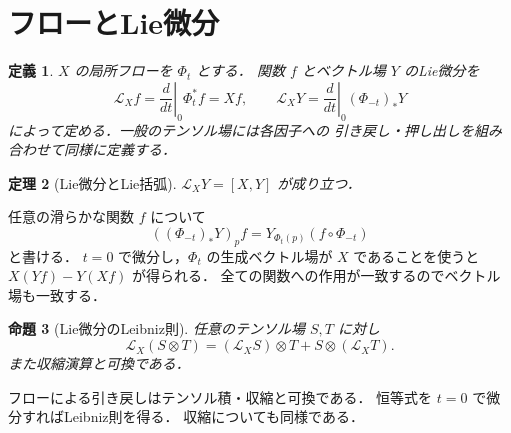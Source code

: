 \documentclass[a5paper,10pt,onecolumn]{jsarticle}
\makeatletter
\theoremstyle{mathnotetheorem}
\newtheorem{theorem}{定理}[section]
\newtheorem{definition}[theorem]{定義}
\newtheorem{proposition}[theorem]{命題}
\renewcommand{\proofname}{証明}
\renewenvironment{proof}[1][\proofname]{%
  \par\pushQED{\qed}\normalfont\topsep4\p@\@plus2\p@\relax
  \trivlist\item[\hskip\labelsep\bfseries #1]\ignorespaces
}{\popQED\endtrivlist\@endpefalse}
\makeatother
\begin{document}
\section{フローとLie微分}
\begin{definition}
$X$ の局所フローを $\Phi_t$ とする．
関数 $f$ とベクトル場 $Y$ のLie微分を
\[
 \mathcal L_Xf=\left.\frac d{dt}\right|_{0}\Phi_t^*f=Xf,
 \qquad
 \mathcal L_XY=
 \left.\frac d{dt}\right|_{0}(\Phi_{-t})_*Y
\]
によって定める．一般のテンソル場には各因子への
引き戻し・押し出しを組み合わせて同様に定義する．
\end{definition}
\begin{theorem}[Lie微分とLie括弧]
$\mathcal L_XY=[X,Y]$ が成り立つ．
\end{theorem}
\begin{proof}
任意の滑らかな関数 $f$ について
\[
 ((\Phi_{-t})_*Y)_pf
 =Y_{\Phi_t(p)}(f\circ\Phi_{-t})
\]
と書ける．
$t=0$ で微分し，$\Phi_t$ の生成ベクトル場が
$X$ であることを使うと
$X(Yf)-Y(Xf)$ が得られる．
全ての関数への作用が一致するのでベクトル場も一致する．
\end{proof}
\begin{proposition}[Lie微分のLeibniz則]
任意のテンソル場 $S,T$ に対し
\[
 \mathcal L_X(S\otimes T)
 =(\mathcal L_XS)\otimes T+S\otimes(\mathcal L_XT).
\]
また収縮演算と可換である．
\end{proposition}
\begin{proof}
フローによる引き戻しはテンソル積・収縮と可換である．
恒等式を $t=0$ で微分すればLeibniz則を得る．
収縮についても同様である．
\end{proof}
\end{document}
